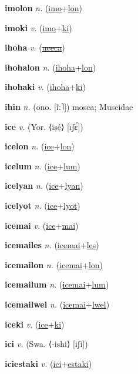 \textbf{\hypertarget{imolon}{imolon}} \textit{n.} (\hyperlink{imo}{imo}+\allowbreak \hyperlink{lon}{lon})


\textbf{\hypertarget{imoki}{imoki}} \textit{v.} (\hyperlink{imo}{imo}+\allowbreak \hyperlink{ki}{ki})


\textbf{\hypertarget{ihoha}{ihoha}} \textit{v.} (\hyperlink{uceca}{\sout{uceca}})


\textbf{\hypertarget{ihohalon}{ihohalon}} \textit{n.} (\hyperlink{ihoha}{ihoha}+\allowbreak \hyperlink{lon}{lon})


\textbf{\hypertarget{ihohaki}{ihohaki}} \textit{v.} (\hyperlink{ihoha}{ihoha}+\allowbreak \hyperlink{ki}{ki})


\textbf{\hypertarget{ihin}{ihin}} \textit{n.} (ono. [ĩː˥])
mosca; Muscidae

\textbf{\hypertarget{ice}{ice}} \textit{v.} (Yor. ⟨iṣẹ́⟩ [īʃɛ́])


\textbf{\hypertarget{icelon}{icelon}} \textit{n.} (\hyperlink{ice}{ice}+\allowbreak \hyperlink{lon}{lon})


\textbf{\hypertarget{icelum}{icelum}} \textit{n.} (\hyperlink{ice}{ice}+\allowbreak \hyperlink{lum}{lum})


\textbf{\hypertarget{icelyan}{icelyan}} \textit{n.} (\hyperlink{ice}{ice}+\allowbreak \hyperlink{lyan}{lyan})


\textbf{\hypertarget{icelyot}{icelyot}} \textit{n.} (\hyperlink{ice}{ice}+\allowbreak \hyperlink{lyot}{lyot})


\textbf{\hypertarget{icemai}{icemai}} \textit{v.} (\hyperlink{ice}{ice}+\allowbreak \hyperlink{mai}{mai})


\textbf{\hypertarget{icemailes}{icemailes}} \textit{n.} (\hyperlink{icemai}{icemai}+\allowbreak \hyperlink{les}{les})


\textbf{\hypertarget{icemailon}{icemailon}} \textit{n.} (\hyperlink{icemai}{icemai}+\allowbreak \hyperlink{lon}{lon})


\textbf{\hypertarget{icemailum}{icemailum}} \textit{n.} (\hyperlink{icemai}{icemai}+\allowbreak \hyperlink{lum}{lum})


\textbf{\hypertarget{icemailwel}{icemailwel}} \textit{n.} (\hyperlink{icemai}{icemai}+\allowbreak \hyperlink{lwel}{lwel})


\textbf{\hypertarget{iceki}{iceki}} \textit{v.} (\hyperlink{ice}{ice}+\allowbreak \hyperlink{ki}{ki})


\textbf{\hypertarget{ici}{ici}} \textit{v.} (Swa. ⟨-ishi⟩ [iʃi])


\textbf{\hypertarget{iciestaki}{iciestaki}} \textit{v.} (\hyperlink{ici}{ici}+\allowbreak \hyperlink{estaki}{estaki})


